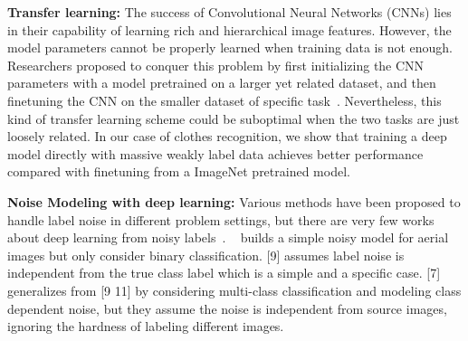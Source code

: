 \documentclass[10pt,twocolumn,letterpaper]{article}
\begin{document}
\noindent
\textbf{Transfer learning:} The success of Convolutional Neural Networks (CNNs) lies in their capability of learning rich and hierarchical image features. However, the model parameters cannot be properly learned when training data is not enough. Researchers proposed to conquer this problem by first initializing the CNN parameters with a model pretrained on a larger yet related dataset, and then finetuning the CNN on the smaller dataset of specific task~\cite{krizhevsky2012imagenet,oquab2013learning,azizpour2014generic}. Nevertheless, this kind of transfer learning scheme could be suboptimal when the two tasks are just loosely related. In our case of clothes recognition, we show that training a deep model directly with massive weakly label data achieves better performance compared with finetuning from a ImageNet pretrained model.

\noindent
\textbf{Noise Modeling with deep learning:} Various methods have been proposed to handle label noise in different problem settings, but there are very few works about deep learning from noisy labels~\cite{mnih2012learning,sukhbaatar2014learning,vahdat2013handling}. ~\cite{mnih2012learning} builds a simple noisy model for aerial images but only consider binary classification. [9] assumes label noise is independent from the true class label which is a simple and a specific case. [7] generalizes from [9 11] by considering multi-class classification and modeling class dependent noise, but they assume the noise is independent from source images, ignoring the hardness of labeling different images.


\end{document}
